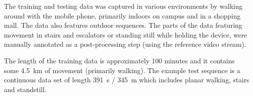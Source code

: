 \documentclass{article}
\newlength{\figurewidth}
\newlength{\figureheight}
\begin{document}
The training and testing data was captured in various environments by walking around with the mobile phone, primarily indoors on campus and in a shopping mall. The data also features outdoor sequences. The parts of the data featuring movement in stairs and escalators or standing still while holding the device, were manually annotated as a post-processing step (using the reference video stream).

The length of the training data is approximately 100 minutes and it contains some 4.5~km of movement (primarily walking). The example test sequence is a continuous data set of length 391~s / 345~m which includes planar walking, stairs and standstill.


\begin{figure}[!t]
  \raggedright\scriptsize
  \setlength{\figurewidth}{0.47\columnwidth}
  \setlength{\figureheight}{\figurewidth}
  \pgfplotsset{
      compat=newest,    
      hide y axis,
      axis x line*=top,
      tick align=outside,
      axis on top,
      minor tick num=1,
  }
  \hspace*{\fill}  
  \begin{subfigure}[t]{0.3\columnwidth}
    \centering


\end{subfigure}
\end{figure}
\end{document}
